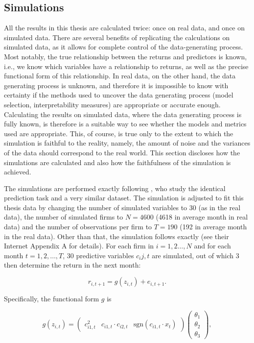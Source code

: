 	\subsection{Simulations}
		All the results in this thesis are calculated twice: once on real data, and once on simulated data. There are several benefits of replicating the calculations on simulated data, as it allows for complete control of the data-generating process. Most notably, the true relationship between the returns and predictors is known, i.e., we know which variables have a relationship to returns, as well as the precise functional form of this relationship. In real data, on the other hand, the data generating process is unknown, and therefore it is impossible to know with certainty if the methods used to uncover the data generating process (model selection, interpretability measures) are appropriate or accurate enough. Calculating the results on simulated data, where the data generating process is fully known, is therefore is a suitable way to see whether the models and metrics used are appropriate. This, of course, is true only to the extent to which the simulation is faithful to the reality, namely, the amount of noise and the variances of the data should correspond to the real world. This section discloses how the simulations are calculated and also how the faithfulness of the simulation is achieved. 
		
		The simulations are performed exactly following \cite{gu2020empirical}, who study the identical prediction task and a very similar dataset. The simulation is adjusted to fit this thesis data by changing the number of simulated variables to 30 (as in the real data), the number of simulated firms to $N=4600$ (4618 in average month in real data) and the number of observations per firm to  $T=190$ (192 in average month in the real data). Other than that, the simulation follows exactly \cite{gu2020empirical} (see their Internet Appendix A for details). For each firm in $i=1, 2\dots,N$ and for each month $t=1, 2, \dots,T$, 30 predictive variables $c_ij,t$ are simulated, out of which 3 then determine the return in the next month:
		
		\begin{equation*}
			r_{i,{t+1}} = g(z_{i,t}) + e_{i,t+1}.
		\end{equation*}
		
		Specifically, the functional form $g$ is 
		
		\begin{equation*}
			g(z_{i,t}) = \begin{pmatrix}
			c_{i1,t}^2 & c_{i1,t}\cdot c_{i2,t} & \text{sgn}(c_{i1,t}\cdot x_t)
			\end{pmatrix} \begin{pmatrix}
			\theta_1 \\ \theta_2 \\ \theta_3
			\end{pmatrix}, 
		\end{equation*}
		
